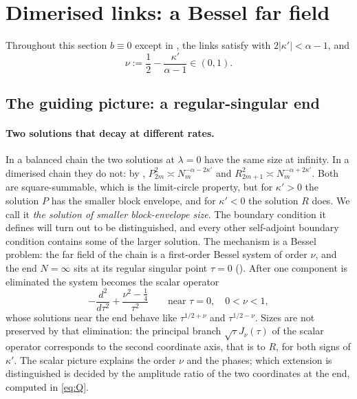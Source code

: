 \section{Dimerised links: a Bessel far field}\label{sec:dimer}

Throughout this section $b\equiv0$ except in , the links satisfy
 with $2|\kappa'|<\alpha-1$, and
\[
  \nu:=\frac12-\frac{\kappa'}{\alpha-1}\in(0,1).
\]

\subsection{The guiding picture: a regular-singular end}\label{sec:dimer-picture}

\paragraph{Two solutions that decay at different rates.} In a balanced chain the two
solutions at $\lambda=0$ have the same size at infinity. In a dimerised chain they do not:
by , $P_{2m}^2\asymp N_m^{-\alpha-2\kappa'}$ and $R_{2m+1}^2\asymp N_m^{-\alpha+2\kappa'}$.
Both are square-summable, which is the limit-circle property, but for $\kappa'>0$ the
solution $P$ has the smaller block envelope, and for $\kappa'<0$ the solution $R$ does. We call it
\emph{the solution of smaller block-envelope size}. The boundary condition it defines will turn out
to be distinguished, and every other self-adjoint boundary condition contains some of the larger
solution. The mechanism is a Bessel problem: the far field of the chain is a first-order Bessel system
of order $\nu$, and the end $N=\infty$ sits at its regular singular point $\tau=0$
(). After one component is eliminated the system becomes the scalar
operator
\[
  -\frac{d^2}{d\tau^2}+\frac{\nu^2-\frac14}{\tau^2}\qquad\text{near }\tau=0,\quad 0<\nu<1,
\]
whose solutions near the end behave like $\tau^{1/2+\nu}$ and $\tau^{1/2-\nu}$. Sizes are not preserved
by that elimination: the principal branch $\sqrt\tau J_\nu(\tau)$ of the scalar operator corresponds
to the second coordinate axis, that is to $R$, for both signs of $\kappa'$. The scalar picture explains
the order $\nu$ and the phases; which extension is distinguished is decided by the amplitude ratio of
the two coordinates at the end, computed in \eqref{eq:Q}.

